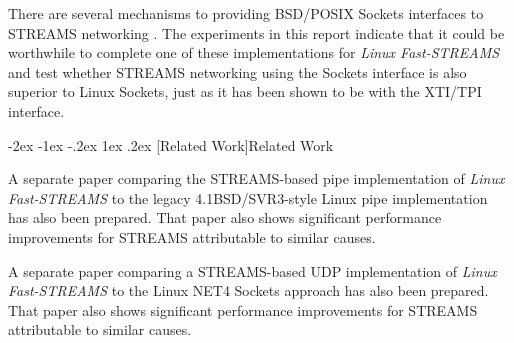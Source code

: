 \documentclass[letterpaper,final,notitlepage,twocolumn,10pt,twoside]{article}
\makeatletter
\renewcommand\section{\@startsection {section}{1}{\z@}%
                                   {-2ex \@plus -1ex \@minus -.2ex}%
                                   {1ex \@plus .2ex}%
                                   {\normalfont\large\bfseries}}
\makeatother
\begin{document}
There are several mechanisms to providing BSD/POSIX Sockets interfaces to STREAMS networking
\cite[]{impbsd} \cite[]{socklib}.  The experiments in this report indicate that it could be
worthwhile to complete one of these implementations for \textsl{Linux Fast-STREAMS} \cite[]{strsock}
and test whether STREAMS networking using the Sockets interface is also superior to Linux Sockets,
just as it has been shown to be with the XTI/TPI interface.

\section[Related Work]{Related Work}

A separate paper comparing the STREAMS-based pipe implementation of \textsl{Linux Fast-STREAMS} to
the legacy 4.1BSD/SVR3-style Linux pipe implementation has also been prepared.  That paper also
shows significant performance improvements for STREAMS attributable to similar causes.

A separate paper comparing a STREAMS-based UDP implementation of \textsl{Linux Fast-STREAMS} to the
Linux NET4 Sockets approach has also been prepared.  That paper also shows significant performance
improvements for STREAMS attributable to similar causes.

\FloatBarrier
{}

\end{document}
